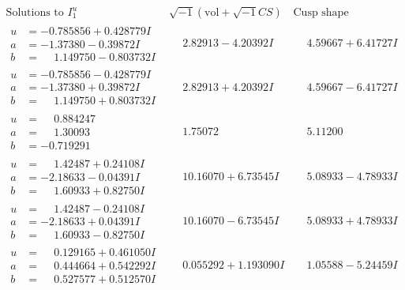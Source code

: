 \documentclass[1p]{elsarticle_modified}
\theoremstyle{definition}
\newcommand{\I}{\sqrt{-1}}
\begin{document}
$$\begin{array}{c|c|c}  
\text{Solutions to }I^u_{1}& \I (\text{vol} + \sqrt{-1}CS) & \text{Cusp shape}\\
 \hline 
\begin{aligned}
u &= -0.785856 + 0.428779 I \\
a &= -1.37380 - 0.39872 I \\
b &= \phantom{-}1.149750 - 0.803732 I\end{aligned}
 & \phantom{-}2.82913 - 4.20392 I & \phantom{-}4.59667 + 6.41727 I \\ \hline\begin{aligned}
u &= -0.785856 - 0.428779 I \\
a &= -1.37380 + 0.39872 I \\
b &= \phantom{-}1.149750 + 0.803732 I\end{aligned}
 & \phantom{-}2.82913 + 4.20392 I & \phantom{-}4.59667 - 6.41727 I \\ \hline\begin{aligned}
u &= \phantom{-}0.884247\phantom{ +0.000000I} \\
a &= \phantom{-}1.30093\phantom{ +0.000000I} \\
b &= -0.719291\phantom{ +0.000000I}\end{aligned}
 & \phantom{-}1.75072\phantom{ +0.000000I} & \phantom{-}5.11200\phantom{ +0.000000I} \\ \hline\begin{aligned}
u &= \phantom{-}1.42487 + 0.24108 I \\
a &= -2.18633 - 0.04391 I \\
b &= \phantom{-}1.60933 + 0.82750 I\end{aligned}
 & \phantom{-}10.16070 + 6.73545 I & \phantom{-}5.08933 - 4.78933 I \\ \hline\begin{aligned}
u &= \phantom{-}1.42487 - 0.24108 I \\
a &= -2.18633 + 0.04391 I \\
b &= \phantom{-}1.60933 - 0.82750 I\end{aligned}
 & \phantom{-}10.16070 - 6.73545 I & \phantom{-}5.08933 + 4.78933 I \\ \hline\begin{aligned}
u &= \phantom{-}0.129165 + 0.461050 I \\
a &= \phantom{-}0.444664 + 0.542292 I \\
b &= \phantom{-}0.527577 + 0.512570 I\end{aligned}
 & \phantom{-}0.055292 + 1.193090 I & \phantom{-}1.05588 - 5.24459 I \\ \hline\begin{aligned}

\end{aligned}
\end{array}$$
\end{document}
